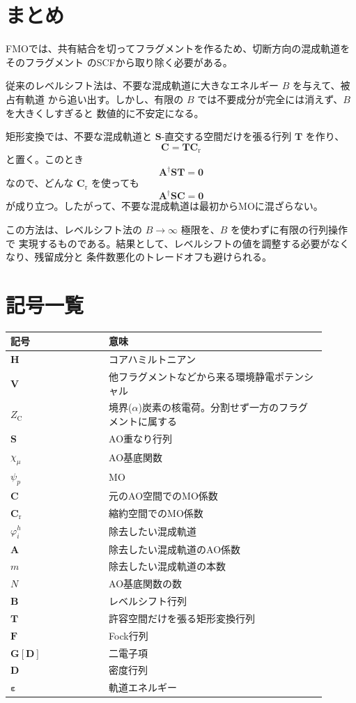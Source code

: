 \documentclass[uplatex,dvipdfmx,11pt]{jsarticle}
\newcommand{\Hcore}{\mathbf H}
\newcommand{\Venv}{\mathbf V}
\newcommand{\Smat}{\mathbf S}
\newcommand{\Amat}{\mathbf A}
\newcommand{\Bmat}{\mathbf B}
\newcommand{\Tmat}{\mathbf T}
\newcommand{\Cmat}{\mathbf C}
\newcommand{\Cr}{\mathbf C_{\mathrm r}}
\newcommand{\Fmat}{\mathbf F}
\newcommand{\Dmat}{\mathbf D}
\newcommand{\Gmat}{\mathbf G}
\begin{document}
\section{まとめ}

FMOでは、共有結合を切ってフラグメントを作るため、切断方向の混成軌道をそのフラグメント
のSCFから取り除く必要がある。

従来のレベルシフト法は、不要な混成軌道に大きなエネルギー \(B\) を与えて、被占有軌道
から追い出す。しかし、有限の \(B\) では不要成分が完全には消えず、\(B\) を大きくしすぎると
数値的に不安定になる。

矩形変換では、不要な混成軌道と \(\Smat\)-直交する空間だけを張る行列 \(\Tmat\) を作り、
\[
  \Cmat=\Tmat\Cr
\]
と置く。このとき
\[
  \Amat^\dagger\Smat\Tmat=\mathbf 0
\]
なので、どんな \(\Cr\) を使っても
\[
  \Amat^\dagger\Smat\Cmat=\mathbf 0
\]
が成り立つ。したがって、不要な混成軌道は最初からMOに混ざらない。

この方法は、レベルシフト法の \(B\to\infty\) 極限を、\(B\) を使わずに有限の行列操作で
実現するものである。結果として、レベルシフトの値を調整する必要がなくなり、残留成分と
条件数悪化のトレードオフも避けられる。

\section*{記号一覧}

\begin{longtable}{|p{0.28\linewidth}|p{0.62\linewidth}|}
\hline
\textbf{記号} & \textbf{意味} \\
\hline
\(\Hcore\) & コアハミルトニアン \\
\hline
\(\Venv\) & 他フラグメントなどから来る環境静電ポテンシャル \\
\hline
\(Z_{\mathrm C}\) & 境界(\(\alpha\))炭素の核電荷。分割せず一方のフラグメントに属する \\
\hline
\(\Smat\) & AO重なり行列 \\
\hline
\(\chi_\mu\) & AO基底関数 \\
\hline
\(\psi_p\) & MO \\
\hline
\(\Cmat\) & 元のAO空間でのMO係数 \\
\hline
\(\Cr\) & 縮約空間でのMO係数 \\
\hline
\(\varphi_i^h\) & 除去したい混成軌道 \\
\hline
\(\Amat\) & 除去したい混成軌道のAO係数 \\
\hline
\(m\) & 除去したい混成軌道の本数 \\
\hline
\(N\) & AO基底関数の数 \\
\hline
\(\Bmat\) & レベルシフト行列 \\
\hline
\(\Tmat\) & 許容空間だけを張る矩形変換行列 \\
\hline
\(\Fmat\) & Fock行列 \\
\hline
\(\Gmat[\Dmat]\) & 二電子項 \\
\hline
\(\Dmat\) & 密度行列 \\
\hline
\(\boldsymbol\varepsilon\) & 軌道エネルギー \\
\hline
\end{longtable}
\end{document}
